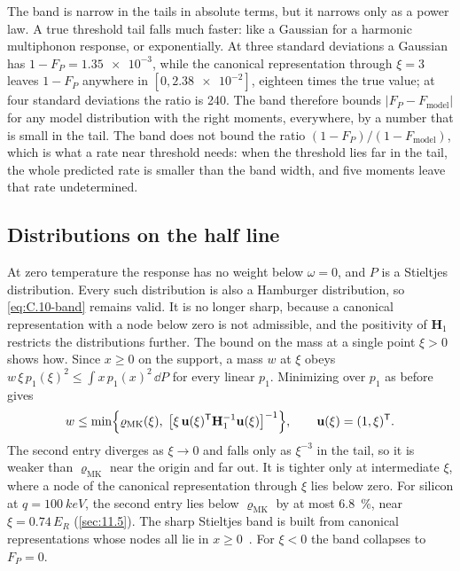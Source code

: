 The band is narrow in the tails in absolute terms, but it narrows only as a power law. A true threshold tail falls much faster: like a Gaussian for a harmonic multiphonon response, or exponentially. At three standard deviations a Gaussian has $1 - F_P = \num{1.35e-3}$, while the canonical representation through $\xi = 3$ leaves $1 - F_P$ anywhere in $[0, \num{2.38e-2}]$, eighteen times the true value; at four standard deviations the ratio is 240. The band therefore bounds $|F_P - F_{\mathrm{model}}|$ for any model distribution with the right moments, everywhere, by a number that is small in the tail. The band does not bound the ratio $(1 - F_P)/(1 - F_{\mathrm{model}})$, which is what a rate near threshold needs: when the threshold lies far in the tail, the whole predicted rate is smaller than the band width, and five moments leave that rate undetermined.

\subsection{Distributions on the half line}

At zero temperature the response has no weight below $\omega = 0$, and $P$ is a Stieltjes distribution. Every such distribution is also a Hamburger distribution, so \cref{eq:C.10-band} remains valid. It is no longer sharp, because a canonical representation with a node below zero is not admissible, and the positivity of $\mathbf{H}_1$ restricts the distributions further. The bound on the mass at a single point $\xi > 0$ shows how. Since $x \ge 0$ on the support, a mass $w$ at $\xi$ obeys $w\,\xi\,p_1(\xi)^2 \le \int x\,p_1(x)^2\,\dd P$ for every linear $p_1$. Minimizing over $p_1$ as before gives
\begin{equation}
  w \le \min\Bigl\{\varrho_{\mathrm{MK}}(\xi),\; \bigl[\xi\,\mathbf{u}(\xi)^{\mathsf{T}}\mathbf{H}_1^{-1}\mathbf{u}(\xi)\bigr]^{-1}\Bigr\}, \qquad \mathbf{u}(\xi) = (1, \xi)^{\mathsf{T}} .
  \label{eq:C.10-stieltjes}
\end{equation}
The second entry diverges as $\xi \to 0$ and falls only as $\xi^{-3}$ in the tail, so it is weaker than $\varrho_{\mathrm{MK}}$ near the origin and far out. It is tighter only at intermediate $\xi$, where a node of the canonical representation through $\xi$ lies below zero. For silicon at $q = \SI{100}{keV}$, the second entry lies below $\varrho_{\mathrm{MK}}$ by at most \SI{6.8}{\percent}, near $\xi = 0.74\,E_R$ (\cref{sec:11.5}). The sharp Stieltjes band is built from canonical representations whose nodes all lie in $x \ge 0$~\cite{krein1977markov}. For $\xi < 0$ the band collapses to $F_P = 0$.
